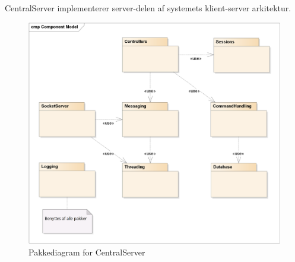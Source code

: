 CentralServer implementerer server-delen af systemets klient-server arkitektur. 

\begin{figure}[H]
    \centering
    \includegraphics[width=1\textwidth]{Systemdesign/CentralServer/Images/Packages.png}
    \caption{Pakkediagram for CentralServer}
    \label{fig:CSPackages}
\end{figure}